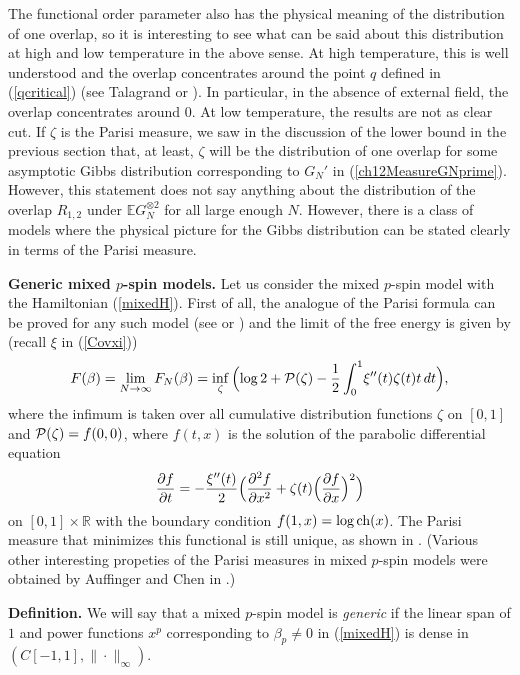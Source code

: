 \documentclass[12pt]{article}
\newcommand{\PP}{{\cal P}}
\newcommand{\ch}{{\mbox{\rm ch}}}
\newcommand{\e}{\mathbb{E}}
\newcommand{\Reals}{\mathbb{R}}
\theoremstyle{nonumberplain}
\begin{document}
The functional order parameter also has the physical meaning of the distribution of one overlap, so it is interesting to see what can be said about this distribution at high and low temperature in the above sense. At high temperature, this is well understood and the overlap concentrates around the point $q$ defined in (\ref{qcritical}) (see Talagrand \cite{TalagrandSK} or \cite{SG2, SG2-2}). In particular, in the absence of external field, the overlap concentrates around $0$. At low temperature, the results are not as clear cut. If $\zeta$ is the Parisi measure, we saw in the discussion of the lower bound in the previous section that, at least, $\zeta$ will be the distribution of one overlap for some asymptotic Gibbs distribution corresponding to $G_N'$ in (\ref{ch12MeasureGNprime}). However, this statement does not say anything about the distribution of the overlap $R_{1,2}$ under $\e G_N^{\otimes 2}$ for all large enough  $N$. However, there is a class of models where the physical picture for the Gibbs distribution can be stated clearly in terms of the Parisi measure.  

\medskip
\noindent
\textbf{Generic mixed $p$-spin models.} Let us consider the {mixed $p$-spin model} with the Hamiltonian (\ref{mixedH}). First of all, the analogue of the Parisi formula can be proved for any such model (see \cite{PPF} or \cite{SKmodel}) and the limit of the free energy is given by (recall $\xi$ in (\ref{Covxi}))
\begin{equation}
F(\beta) = \lim_{N\to\infty} F_N(\beta) = \inf_{\zeta}\, \Bigl(\log 2 + \PP(\zeta) -\frac{1}{2}\int_{0}^{1}\! \xi''(t) \zeta(t)t\, dt\Bigr),
\label{ch30ParisiG}
\end{equation}
where the infimum is taken over all cumulative distribution functions $\zeta$ on $[0,1]$  and $\PP(\zeta) = f(0,0)$, where $f(t,x)$ is the solution of the parabolic differential equation
$$
\frac{\partial f}{\partial t} = -\frac{\xi''(t)}{2}
\Bigl(
\frac{\partial^2 f}{\partial x^2} + \zeta(t)
\Bigl(\frac{\partial f}{\partial x}\Bigr)^2
\Bigr)
$$
on $[0,1]\times \Reals$ with the boundary condition $f(1,x) = \log \ch(x)$. The Parisi measure that minimizes this functional is still unique, as shown in \cite{AufChen1}. (Various other interesting propeties of the Parisi measures in mixed $p$-spin models were obtained by Auffinger and Chen in \cite{AufChen1}.)

\medskip
\noindent
\textbf{Definition.}
We will say that a mixed $p$-spin model is \emph{generic} if the linear span of $1$ and power functions $x^p$ corresponding to $\beta_p \not = 0$ in (\ref{mixedH}) is dense in $(C[-1,1],\|\cdot\|_\infty)$. 
\end{document}
